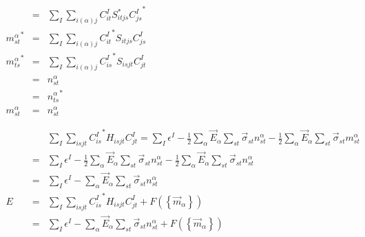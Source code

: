 \documentclass{article}
\begin{document}
\begin{eqnarray*}
 &  = & \sum_I \sum_{i(\alpha)j} C^I_{it} S_{itjs}^* {C^I_{js}}^* \\
{m^\alpha_{st}}^* &  = & \sum_I \sum_{i(\alpha)j} {C^I_{it}}^* S_{itjs} {C^I_{js}} \\
{m^\alpha_{ts}}^* &  = & \sum_I \sum_{i(\alpha)j} {C^I_{is}}^* S_{isjt} {C^I_{jt}} \\
 & = & n^\alpha_{st} \\
 & = & {n^\alpha_{ts}}^* \\
m^\alpha_{st}  & = &  n^\alpha_{st} \\
\\
\\
&& \sum_I \sum_{isjt} {C^I_{is}}^* H_{isjt} C^I_{jt} =
    \sum_I \epsilon^I -
    \frac{1}{2} \sum_\alpha \vec{E}_{\alpha} \sum_{st} \vec{\sigma}_{st} n^\alpha_{st} - 
    \frac{1}{2} \sum_\alpha \vec{E}_{\alpha} \sum_{st} \vec{\sigma}_{st} m^\alpha_{st} \\
& = &
    \sum_I \epsilon^I -
    \frac{1}{2} \sum_\alpha \vec{E}_{\alpha} \sum_{st} \vec{\sigma}_{st} n^\alpha_{st} - 
    \frac{1}{2} \sum_\alpha \vec{E}_{\alpha} \sum_{st} \vec{\sigma}_{st} n^\alpha_{st} \\
& = & \sum_I \epsilon^I - \sum_\alpha \vec{E}_{\alpha} \sum_{st} \vec{\sigma}_{st} n^\alpha_{st} \\
E & = & \sum_I \sum_{isjt} {C^I_{is}}^* H_{isjt} C^I_{jt} + F(\left\{ \vec{m}_\alpha \right\} ) \\
  & = & \sum_I \epsilon^I - \sum_\alpha \vec{E}_{\alpha} \sum_{st} \vec{\sigma}_{st} n^\alpha_{st} + F(\left\{ \vec{m}_\alpha \right\} ) \\
\end{eqnarray*}
\end{document}
